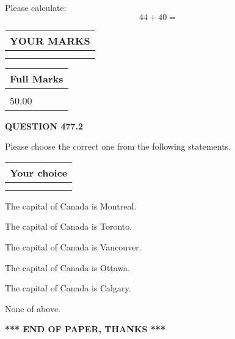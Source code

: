 \documentclass[12pt]{article}
\begin{document}
  
 
Please calculate:
\begin{equation}
44 +  %
40 = \nonumber
\end{equation}
 

 

 
  
\vspace{0.2in}
  
\noindent\begin{tabular}{|l|}
\hline
 YOUR MARKS  \\
\hline
 \\ 
 \\ 
\hline
\end{tabular}
\hspace{0.05in} \begin{tabular}{|l|}
\hline
 Full Marks  \\
\hline
 \\ 
50.00 \\
\hline
\end{tabular}
{\textbf{\Large{QUESTION
477.2 
}}}
  
  
Please choose the correct one from the following statements.
  
  
\noindent\hspace{3.0in} \begin{tabular}{|l|}
\hline
Your choice \\
\hline
 \\ 
 \\ 
\hline
\end{tabular}
  
  
 
 
The capital of Canada is Montreal.
 
 
The capital of Canada is Toronto.
 
 
The capital of Canada is Vancouver.
 
 
The capital of Canada is Ottawa.
 
 
The capital of Canada is Calgary.
 
 
 None of above.
 
 
   
   
 \vspace{0.2in}
 
   
   
   
   
\vspace{1.0in} 
{\textbf{\large{ *** END OF PAPER, THANKS *** }}} 
   
\end{document}
